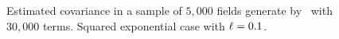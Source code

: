 \begin{figure}[H]
 \centering
 \label{covar_sexpKL}
 \caption{Estimated covariance in a sample of $5,000$ fields generate by \kle\ with $30,000$ terms. Squared exponential case with $\ell = 0.1$.}
\end{figure}

